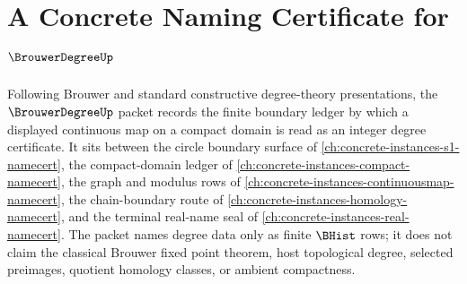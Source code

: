 \chapter{A Concrete Naming Certificate for $\BrouwerDegreeUp$}
\label{ch:concrete-instances-brouwer-degree-namecert}

Following Brouwer and standard constructive degree-theory presentations, the $\BrouwerDegreeUp$ packet records the finite boundary ledger by which a displayed continuous map on a compact domain is read as an integer degree certificate. It sits between the circle boundary surface of \autoref{ch:concrete-instances-s1-namecert}, the compact-domain ledger of \autoref{ch:concrete-instances-compact-namecert}, the graph and modulus rows of \autoref{ch:concrete-instances-continuousmap-namecert}, the chain-boundary route of \autoref{ch:concrete-instances-homology-namecert}, and the terminal real-name seal of \autoref{ch:concrete-instances-real-namecert}. The packet names degree data only as finite $\BHist$ rows; it does not claim the classical Brouwer fixed point theorem, host topological degree, selected preimages, quotient homology classes, or ambient compactness.

